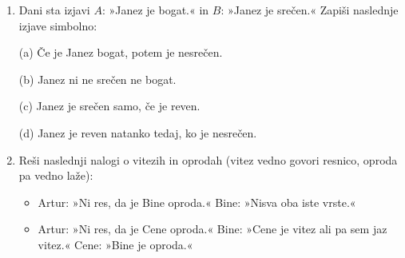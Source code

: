 \documentclass[11pt,paper=b5,DIV=13,headinclude,footinclude]{scrbook}
\def\ali {{~\vee~}}
\def\inn {{~\wedge~}}
\begin{document}
\begin{enumerate}
{(a) $A\ali B$

(b) $A\inn B$

(c) $A\inn \neg B$

(d) $\neg A\ali \neg B$

(e) $\neg \neg A$

(f) $\neg (\neg A\inn \neg B)$
}

\medskip
\item
{\color{blue}
Dani sta izjavi $A$: »Janez je bogat.« in $B$: »Janez je srečen.« Zapiši
naslednje izjave simbolno:

(a) {\color{blue}Če je Janez bogat, potem je nesrečen.}

(b) {\color{blue}Janez ni ne srečen ne bogat.}

(c) {\color{blue}Janez je srečen samo, če je reven.}

(d) {\color{blue}Janez je reven natanko tedaj, ko je nesrečen.}
}

\item {\color{blue}Reši naslednji nalogi o vitezih in oprodah (vitez vedno
govori resnico, oproda pa vedno laže):}
\begin{itemize}
  \item {\color{blue}Artur: »Ni res, da je Bine oproda.« Bine: »Nisva oba iste vrste.«}
  \item {\color{blue}Artur: »Ni res, da je Cene oproda.« Bine: »Cene je vitez ali pa sem jaz vitez.« Cene: »Bine je oproda.«}
\end{itemize}


\end{enumerate}
\end{document}
